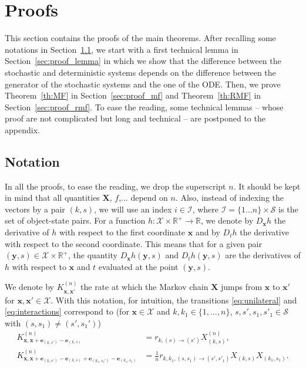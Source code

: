 \documentclass[acmsmall]{acmart}
\newcommand\bx{\mathbf{x}}
\newcommand\be{\mathbf{e}}
\newcommand\bX{\mathbf{X}}
\newcommand\by{\mathbf{y}}
\newcommand\calX{\mathcal{X}}
\newcommand\calI{\mathcal{I}}
\newcommand\calS{\mathcal{S}}
\newcommand\toN{^{(n)}}
\newcommand{\R}{\ensuremath{\mathbb{R}}}
\begin{document}

\section{Proofs}
\label{sec:proofs}

This section contains the proofs of the main theorems. After recalling some notations in Section~\ref{sec:proof_notation}, we start with a first technical lemma in Section~\ref{sec:proof_lemma} in which we show that the difference between the stochastic and deterministic systems depends on the difference between the generator of the stochastic systems and the one of the ODE. Then, we prove Theorem~\ref{th:MF} in Section~\ref{sec:proof_mf} and Theorem~\ref{th:RMF} in Section~\ref{sec:proof_rmf}. To ease the reading, some technical lemmas -- whose proof are not complicated but long and technical -- are postponed to the appendix.


\subsection{Notation}
\label{sec:proof_notation}

In all the proofs, to ease the reading, we drop the superscript $n$. It should be kept in mind that all quantities $\bX$, $f$,... depend on $n$. Also, instead of indexing the vectors by a pair $(k,s)$, we will use an index $i\in\calI$, where $\calI=\{1\dots n\}\times\calS$ is the set of object-state pairs. For a function $h:\calX\times \R^+\to\R$, we denote by $D_\bx h$ the derivative of $h$ with respect to the first coordinate $\bx$ and by $D_th$ the derivative with respect to the second coordinate. This means that for a given pair $(\by,s)\in\calX \times \R^+$, the quantity $D_\bx h(\by,s)$ and $D_t h(\by,s)$ are the derivatives of $h$ with respect to $\bx$ and $t$ evaluated at the point $(\by,s)$.


We denote by $K_{\bx,\bx'}^{(n)}$ the rate at which the Markov chain $\bX$ jumps from $\bx$ to $\bx'$ for $\bx,\bx'\in\calX$. With this notation, for intuition, the transitions \eqref{eq:unilateral} and \eqref{eq:interactions} correspond to (for $\bx\in\calX$ and $k,k_1\in\{1,\dots, n\}$, $s,s',s_1,s'_1\in\calS$ with $(s,s_1) \ne (s',s_1')$)
\begin{align*}
  K_{\bx, \bx + \be_{(k,s')}-\be_{(k,s)}}\toN &= r_{k,(s)\rightarrow(s')} X_{(k,s)}\toN, \\
  K_{\bx, \bx + \be_{(k,s')}-\be_{(k,s)} + \be_{(k_1,s_1')}-\be_{(k_1,s_1)}}\toN &= \frac1n r_{k,k_1,(s,s_1)\rightarrow(s',s'_1)} X_{(k,s)}X_{(k_1,s_1)}.
\end{align*}
\end{document}
